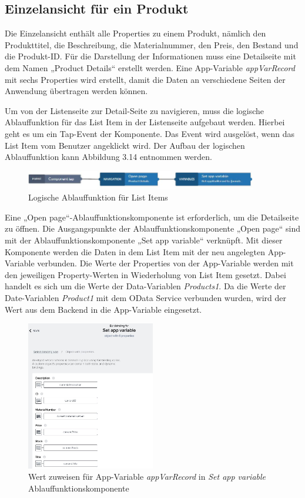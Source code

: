 \subsection{Einzelansicht für ein Produkt}
Die Einzelansicht enthält alle Properties zu einem Produkt, nämlich den Produkttitel, die Beschreibung, die Materialnummer, den Preis, den Bestand und die Produkt-ID. Für die Darstellung der Informationen muss eine Detailseite mit dem Namen „Product Details“ erstellt werden. Eine App-Variable \textit{appVarRecord} mit sechs Properties wird erstellt, damit die Daten an verschiedene Seiten der Anwendung übertragen werden können.

Um von der Listenseite zur Detail-Seite zu navigieren, muss die logische Ablauffunktion für das List Item in der Listenseite aufgebaut werden. Hierbei geht es um ein Tap-Event der Komponente. Das Event wird ausgelöst, wenn das List Item vom Benutzer angeklickt wird. Der Aufbau der logischen Ablauffunktion kann Abbildung 3.14 entnommen werden. 
\begin{figure}[htbp]
 \centering
 \includegraphics[width=0.9\textwidth]{Bilder/appgyver/3_14_Logik_ListItem.JPG}
 \caption{Logische Ablauffunktion für List Items}
\end{figure}

Eine „Open page“-Ablauffunktionskomponente ist erforderlich, um die Detailseite zu öffnen. Die Ausgangspunkte der Ablauffunktionskomponente „Open page“ sind mit der Ablauffunktionskomponente „Set app variable“ verknüpft. Mit dieser Komponente werden die Daten in dem List Item mit der neu angelegten App-Variable verbunden. Die Werte der Properties von der App-Variable werden mit den jeweiligen Property-Werten in Wiederholung von List Item gesetzt. Dabei handelt es sich um die Werte der Data-Variablen \textit{Products1}. Da die Werte der Date-Variablen \textit{Product1} mit dem OData Service verbunden wurden, wird der Wert aus dem Backend in die App-Variable eingesetzt.

\begin{figure}[htbp]
 \centering
 \includegraphics[width=0.5\textwidth]{Bilder/appgyver/3_15_set_app_variable.JPG}
 \caption{Wert zuweisen für App-Variable \textit{appVarRecord} in \textit{Set app variable} Ablauffunktionskomponente}
\end{figure}

